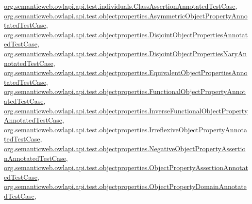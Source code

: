 \hyperlink{classorg_1_1semanticweb_1_1owlapi_1_1api_1_1test_1_1individuals_1_1_class_assertion_annotated_test_case_a02e2ae5ea8cb94f4459e7f4221c6a2b8}{org.\-semanticweb.\-owlapi.\-api.\-test.\-individuals.\-Class\-Assertion\-Annotated\-Test\-Case}, \hyperlink{classorg_1_1semanticweb_1_1owlapi_1_1api_1_1test_1_1objectproperties_1_1_asymmetric_object_property_annotated_test_case_a4733e33fc5fb51fcb11fb4d65f2ed0c9}{org.\-semanticweb.\-owlapi.\-api.\-test.\-objectproperties.\-Asymmetric\-Object\-Property\-Annotated\-Test\-Case}, \hyperlink{classorg_1_1semanticweb_1_1owlapi_1_1api_1_1test_1_1objectproperties_1_1_disjoint_object_properties_annotated_test_case_a2914376e128413115c6e556a632e764c}{org.\-semanticweb.\-owlapi.\-api.\-test.\-objectproperties.\-Disjoint\-Object\-Properties\-Annotated\-Test\-Case}, \hyperlink{classorg_1_1semanticweb_1_1owlapi_1_1api_1_1test_1_1objectproperties_1_1_disjoint_object_properties_nary_annotated_test_case_a60f576ef39e63d0d486913cd5bfba24f}{org.\-semanticweb.\-owlapi.\-api.\-test.\-objectproperties.\-Disjoint\-Object\-Properties\-Nary\-Annotated\-Test\-Case}, \hyperlink{classorg_1_1semanticweb_1_1owlapi_1_1api_1_1test_1_1objectproperties_1_1_equivalent_object_properties_annotated_test_case_a18002c0093ae6585b373608b3c66de7a}{org.\-semanticweb.\-owlapi.\-api.\-test.\-objectproperties.\-Equivalent\-Object\-Properties\-Annotated\-Test\-Case}, \hyperlink{classorg_1_1semanticweb_1_1owlapi_1_1api_1_1test_1_1objectproperties_1_1_functional_object_property_annotated_test_case_a82709026b4b9e678eaa88bba1c78e319}{org.\-semanticweb.\-owlapi.\-api.\-test.\-objectproperties.\-Functional\-Object\-Property\-Annotated\-Test\-Case}, \hyperlink{classorg_1_1semanticweb_1_1owlapi_1_1api_1_1test_1_1objectproperties_1_1_inverse_functional_object_property_annotated_test_case_aae21cc24bd7efa2b94ac56f43c6d2a96}{org.\-semanticweb.\-owlapi.\-api.\-test.\-objectproperties.\-Inverse\-Functional\-Object\-Property\-Annotated\-Test\-Case}, \hyperlink{classorg_1_1semanticweb_1_1owlapi_1_1api_1_1test_1_1objectproperties_1_1_irreflexive_object_property_annotated_test_case_a4517cfd070c4228bb637718abbbb621e}{org.\-semanticweb.\-owlapi.\-api.\-test.\-objectproperties.\-Irreflexive\-Object\-Property\-Annotated\-Test\-Case}, \hyperlink{classorg_1_1semanticweb_1_1owlapi_1_1api_1_1test_1_1objectproperties_1_1_negative_object_property_assertion_annotated_test_case_a655e62067cbe92f4803466b7d4a5afb5}{org.\-semanticweb.\-owlapi.\-api.\-test.\-objectproperties.\-Negative\-Object\-Property\-Assertion\-Annotated\-Test\-Case}, \hyperlink{classorg_1_1semanticweb_1_1owlapi_1_1api_1_1test_1_1objectproperties_1_1_object_property_assertion_annotated_test_case_a9cf6ed99bfe0ce0b415373b7144efd17}{org.\-semanticweb.\-owlapi.\-api.\-test.\-objectproperties.\-Object\-Property\-Assertion\-Annotated\-Test\-Case}, \hyperlink{classorg_1_1semanticweb_1_1owlapi_1_1api_1_1test_1_1objectproperties_1_1_object_property_domain_annotated_test_case_a286578458f3934a9d6c8da8e6f2535cd}{org.\-semanticweb.\-owlapi.\-api.\-test.\-objectproperties.\-Object\-Property\-Domain\-Annotated\-Test\-Case}, 